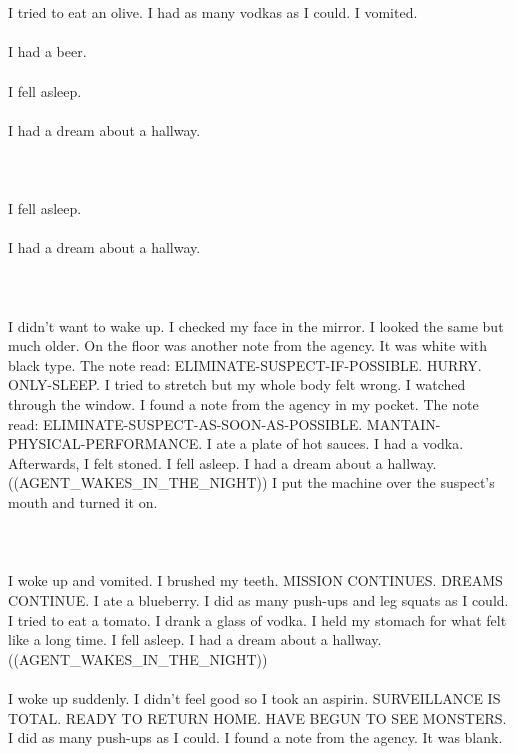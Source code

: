 \documentclass{article}
\begin{document}
    \section{}
    I tried to eat an olive. I had as many vodkas as I could. I vomited.\\\\I had a beer.\\\\I fell asleep.\\\\I had a dream about a hallway.\\\\ 
    \newpage
    
    \section{}
    I fell asleep.\\\\I had a dream about a hallway.\\\\ 
    \newpage
    
    \section{}
    I didn't want to wake up. I checked my face in the mirror. I looked the same but much older. On the floor was another note from the agency. It was white with black type. The note read: ELIMINATE-SUSPECT-IF-POSSIBLE. HURRY. ONLY-SLEEP. I tried to stretch but my whole body felt wrong. I watched through the window. I found a note from the agency in my pocket. The note read: ELIMINATE-SUSPECT-AS-SOON-AS-POSSIBLE. MANTAIN-PHYSICAL-PERFORMANCE. I ate a plate of hot sauces. I had a vodka. Afterwards, I felt stoned. I fell asleep. I had a dream about a hallway. ((AGENT_WAKES_IN_THE_NIGHT)) I put the machine over the suspect's mouth and turned it on. \\\\
    \newpage
    
    \section{}
    I woke up and vomited. I brushed my teeth. MISSION CONTINUES. DREAMS CONTINUE. I ate a blueberry. I did as many push-ups and leg squats as I could. I tried to eat a tomato. I drank a glass of vodka. I held my stomach for what felt like a long time. I fell asleep. I had a dream about a hallway. ((AGENT_WAKES_IN_THE_NIGHT)) \\\\I woke up suddenly. I didn't feel good so I took an aspirin. SURVEILLANCE IS TOTAL. READY TO RETURN HOME. HAVE BEGUN TO SEE MONSTERS. I did as many push-ups as I could. I found a note from the agency. It was blank. \\\\
    \newpage
    
\end{document}
